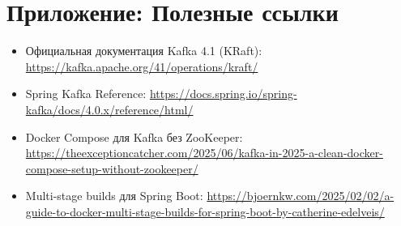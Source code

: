 \documentclass[a4paper,12pt]{article}
\begin{document}
\section*{Приложение: Полезные ссылки}
\begin{itemize}
    \item Официальная документация Kafka 4.1 (KRaft): \url{https://kafka.apache.org/41/operations/kraft/}
    \item Spring Kafka Reference: \url{https://docs.spring.io/spring-kafka/docs/4.0.x/reference/html/}
    \item Docker Compose для Kafka без ZooKeeper: \url{https://theexceptioncatcher.com/2025/06/kafka-in-2025-a-clean-docker-compose-setup-without-zookeeper/}
    \item Multi-stage builds для Spring Boot: \url{https://bjoernkw.com/2025/02/02/a-guide-to-docker-multi-stage-builds-for-spring-boot-by-catherine-edelveis/}
\end{itemize}
\end{document}
